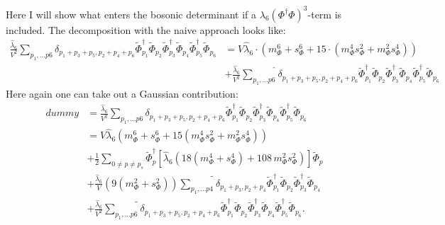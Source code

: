{Here I will show what enters the bosonic determinant if a $\lambda_6 (\Phi^{\dagger}\Phi)^3$-term is included.
The decomposition with the naive approach looks like:
\begin{align}\label{eq:naive_decomposition_of_phi6_term}
 \frac{\hat\lambda_6}{V^2}\sum\limits_{p_1,\dots p6} \delta_{p_1 + p_3 + p_5, p_2 + p_4 + p_6} 
                     \tilde\Phi_{p_1}^{\dagger} \tilde\Phi_{p_2} \tilde\Phi_{p_3}^{\dagger} \tilde\Phi_{p_4} \tilde\Phi_{p_5}^{\dagger} \tilde\Phi_{p_6}
      &=  V \hat\lambda_6 \cdot \left( m_{\Phi}^6 + s_{\Phi}^6 + 15\cdot\left(m_{\Phi}^4 s_{\Phi}^2 + m_{\Phi}^2 s_{\Phi}^4 \right) \right) 
    \nonumber \\
      & + \frac{\hat\lambda_6}{V^2}\widehat{\sum\limits_{p_1,\dots p6}} \delta_{p_1 + p_3 + p_5, p_2 + p_4 + p_6} 
                     \tilde\Phi_{p_1}^{\dagger} \tilde\Phi_{p_2} \tilde\Phi_{p_3}^{\dagger} \tilde\Phi_{p_4} \tilde\Phi_{p_5}^{\dagger} \tilde\Phi_{p_6}
\end{align}
Here again one can take out a Gaussian contribution:
\begin{align}\label{eq:alternative_decomposition_of_phi6_term}
 dummy&=\frac{\hat\lambda_6}{V^2}\sum\limits_{p_1,\dots p6} \delta_{p_1 + p_3 + p_5, p_2 + p_4 + p_6} 
                     \tilde\Phi_{p_1}^{\dagger} \tilde\Phi_{p_2} \tilde\Phi_{p_3}^{\dagger} \tilde\Phi_{p_4} \tilde\Phi_{p_5}^{\dagger} \tilde\Phi_{p_6}
    \nonumber \\
      &=  V \hat\lambda_6 \left( m_{\Phi}^6 + s_{\Phi}^6 + 15\left(m_{\Phi}^4 s_{\Phi}^2 + m_{\Phi}^2 s_{\Phi}^4 \right) \right) 
    \nonumber \\
      & +  \frac{1}{2} \sum\limits_{0\neq p\neq p_s} \tilde\Phi_p^{\dagger} \left[ \hat\lambda_6\left( 18 \left( m_{\Phi}^4 + s_{\Phi}^4 \right) 
                       + 108\,  m_{\Phi}^2 s_{\Phi}^2\right)
                       \right]   \tilde\Phi_p
    \nonumber \\
      & + \frac{\hat\lambda_6}{V} \left( 9\left( m_{\Phi}^2 + s_{\Phi}^2 \right) \right)\widetilde{\sum\limits_{p_1,\dots p4}} \delta_{p_1 + p_3, p_2 + p_4 } 
                     \tilde\Phi_{p_1}^{\dagger} \tilde\Phi_{p_2} \tilde\Phi_{p_3}^{\dagger} \tilde\Phi_{p_4}
    \nonumber \\
      & + \frac{\hat\lambda_6}{V^2}\widetilde{\sum\limits_{p_1,\dots p6}} \delta_{p_1 + p_3 + p_5, p_2 + p_4 + p_6}
                     \tilde\Phi_{p_1}^{\dagger} \tilde\Phi_{p_2} \tilde\Phi_{p_3}^{\dagger} \tilde\Phi_{p_4} \tilde\Phi_{p_5}^{\dagger} \tilde\Phi_{p_6}.
\end{align}
}
